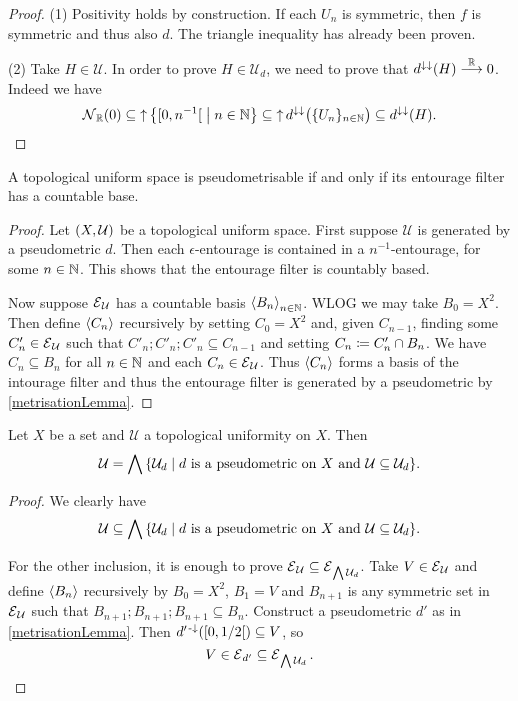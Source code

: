 \begin{proof}
(1) Positivity holds by construction. If each $U_n$ is symmetric, then $f$ is symmetric and thus also $d$. The triangle inequality has already been proven.

(2) Take $H\in \mathcal{U}$. In order to prove $H\in \mathcal{U}_d$, we need to prove that $d^{\downarrow\downarrow}(H)\overset{\mathbb{R}}{\longrightarrow} 0$. Indeed we have
\[ \neighbourhood_\R(0) \subseteq \upset \setbuilder{\interval[co]{0, n^{-1}}}{n\in \N} \subseteq \upset d^{\imf\imf}\big(\{U_n\}_{n\in\N}\big) \subseteq d^{\imf\imf}(H). \]
\end{proof}

\begin{theorem}
A topological uniform space is pseudometrisable \textup{if and only if} its entourage filter has a countable base.
\end{theorem}
\begin{proof}
Let $\sSet{X,\mathcal{U}}$ be a topological uniform space. First suppose $\mathcal{U}$ is generated by a pseudometric $d$. Then each $\epsilon$-entourage is contained in a $n^{-1}$-entourage, for some $n\in \mathbb{N}$. This shows that the entourage filter is countably based.

Now suppose $\operatorname{\mathcal{E}}_\mathcal{U}$ has a countable basis $\left\langle B_n \right\rangle_{n\in \mathbb{N}}$. WLOG we may take $B_0 = X^2$. Then define $\left\langle C_n \right\rangle$ recursively by setting $C_0 = X^2$ and, given $C_{n-1}$, finding some $C'_{n}\in \operatorname{\mathcal{E}}_\mathcal{U}$ such that $C'_{n};C'_{n};C'_{n} \subseteq C_{n-1}$ and setting $C_n \coloneqq C'_n \cap B_n$. We have $C_n\subseteq B_n$ for all $n\in \mathbb{N}$ and each $C_n\in \operatorname{\mathcal{E}}_\mathcal{U}$. Thus $\left\langle C_n \right\rangle$ forms a basis of the intourage filter and thus the entourage filter is generated by a pseudometric by \ref{metrisationLemma}. 
\end{proof}

\begin{proposition} \label{topologicalUniformityGeneratedByPseudometrics}
Let $X$ be a set and $\mathcal{U}$ a topological uniformity on $X$. Then 
\[ \mathcal{U} =  \bigwedge \setbuilder{\mathcal{U}_d}{\text{$d$ is a pseudometric on $X$ and $\mathcal{U}\subseteq \mathcal{U}_d$}}. \]
\end{proposition}
\begin{proof}
We clearly have
\[ \mathcal{U} \subseteq \bigwedge \setbuilder{\mathcal{U}_d}{\text{$d$ is a pseudometric on $X$ and $\mathcal{U}\subseteq \mathcal{U}_d$}}. \]

For the other inclusion, it is enough to prove $\operatorname{\mathcal{E}}_\mathcal{U} \subseteq \operatorname{\mathcal{E}}_{\bigwedge \mathcal{U}_d}$. Take $V\in \operatorname{\mathcal{E}}_\mathcal{U}$ and define $\left\langle B_n \right\rangle$ recursively by $B_0 = X^2$, $B_1 = V$ and $B_{n+1}$ is any symmetric set in $\operatorname{\mathcal{E}}_\mathcal{U}$ such that $B_{n+1};B_{n+1};B_{n+1} \subseteq B_n$. Construct a pseudometric $d'$ as in \ref{metrisationLemma}. Then $d^{\prime\preimf}(\interval[co]{0,1/2})\subseteq V$, so
\[ V \in \operatorname{\mathcal{E}}_{d'} \subseteq \operatorname{\mathcal{E}}_{\bigwedge \mathcal{U}_d}. \]
\end{proof}

